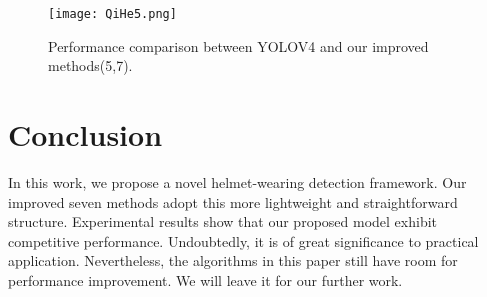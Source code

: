 \documentclass[journal]{IEEEtran}
\begin{document}
\begin{figure}[h]
\centerline{\texttt{[image: QiHe5.png]}}

\caption{Performance comparison between YOLOV4 and our improved methods(5,7).}
\end{figure}
\section{Conclusion}
In this work, we propose a novel
helmet-wearing detection framework. Our improved seven methods adopt this more lightweight and straightforward structure. Experimental results show that our proposed model exhibit competitive performance. Undoubtedly, it is of great significance to practical application. Nevertheless, the algorithms in this paper still have room for performance improvement. We will leave it for our further work.
\end{document}
